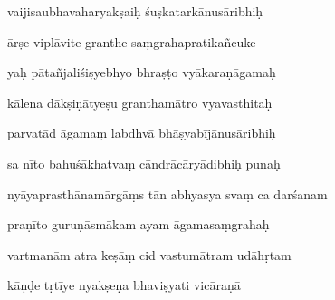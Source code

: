 \documentclass[article,12pt,a4paper]{memoir}%
\newcounter{parCount}
\begin{document}
	  
	  \pstart {} vaijisaubhavaharyakṣaiḥ śuṣkatarkānusāribhiḥ 
	{}
	\pend%
      

	  
	  \pstart \leavevmode%
	ārṣe viplāvite granthe saṃgrahapratikañcuke 
	{}
	\pend%
      

	  
	  \pstart {} yaḥ pātañjaliśiṣyebhyo bhraṣṭo vyākaraṇāgamaḥ 
	{}
	\pend%
      

	  
	  \pstart \leavevmode%
	kālena dākṣiṇātyeṣu granthamātro vyavasthitaḥ 
	{}
	\pend%
      

	  
	  \pstart {} parvatād āgamaṃ labdhvā bhāṣyabījānusāribhiḥ 
	{}
	\pend%
      

	  
	  \pstart \leavevmode%
	sa nīto bahuśākhatvaṃ cāndrācāryādibhiḥ punaḥ 
	{}
	\pend%
      

	  
	  \pstart {} nyāyaprasthānamārgāṃs tān abhyasya svaṃ ca darśanam 
	{}
	\pend%
      

	  
	  \pstart \leavevmode%
	praṇīto guruṇāsmākam ayam āgamasaṃgrahaḥ 
	{}
	\pend%
      

	  
	  \pstart {} vartmanām atra keṣāṃ cid vastumātram udāhṛtam 
	{}
	\pend%
      

	  
	  \pstart \leavevmode%
	kāṇḍe tṛtīye nyakṣeṇa bhaviṣyati vicāraṇā 
	{}
	\pend%
      
\end{document}
